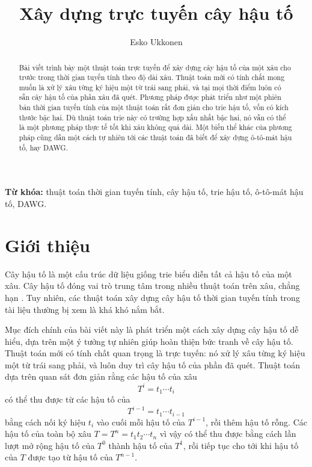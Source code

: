 \documentclass[11pt]{article}
\title{Xây dựng trực tuyến cây hậu tố}
\author{Esko Ukkonen}
\date{}
\begin{document}
\maketitle


\begin{abstract}
Bài viết trình bày một thuật toán trực tuyến để xây dựng cây hậu tố của một
xâu cho trước trong thời gian tuyến tính theo độ dài xâu. Thuật toán mới có
tính chất mong muốn là xử lý xâu từng ký hiệu một từ trái sang phải, và tại
mọi thời điểm luôn có sẵn cây hậu tố của phần xâu đã quét. Phương pháp được
phát triển như một phiên bản thời gian tuyến tính của một thuật toán rất đơn
giản cho trie hậu tố, vốn có kích thước bậc hai. Dù thuật toán trie này có
trường hợp xấu nhất bậc hai, nó vẫn có thể là một phương pháp thực tế tốt khi
xâu không quá dài. Một biến thể khác của phương pháp cũng dẫn một cách tự
nhiên tới các thuật toán đã biết để xây dựng ô-tô-mát hậu tố, hay DAWG.
\end{abstract}

\noindent\textbf{Từ khóa:} thuật toán thời gian tuyến tính, cây hậu tố, trie
hậu tố, ô-tô-mát hậu tố, DAWG.

\section{Giới thiệu}

Cây hậu tố là một cấu trúc dữ liệu giống trie biểu diễn tất cả hậu tố của một
xâu. Cây hậu tố đóng vai trò trung tâm trong nhiều thuật toán trên xâu, chẳng
hạn \cite{apostolico,galil-giancarlo,amir-farach}. Tuy nhiên, các thuật toán
xây dựng cây hậu tố thời gian tuyến tính trong tài liệu thường bị xem là khá
khó nắm bắt.

Mục đích chính của bài viết này là phát triển một cách xây dựng cây hậu tố dễ
hiểu, dựa trên một ý tưởng tự nhiên giúp hoàn thiện bức tranh về cây hậu tố.
Thuật toán mới có tính chất quan trọng là trực tuyến: nó xử lý xâu từng ký
hiệu một từ trái sang phải, và luôn duy trì cây hậu tố của phần đã quét. Thuật
toán dựa trên quan sát đơn giản rằng các hậu tố của xâu
\[
  T^i=t_1\cdots t_i
\]
có thể thu được từ các hậu tố của
\[
  T^{i-1}=t_1\cdots t_{i-1}
\]
bằng cách nối ký hiệu $t_i$ vào cuối mỗi hậu tố của $T^{i-1}$, rồi thêm hậu tố
rỗng. Các hậu tố của toàn bộ xâu $T=T^n=t_1t_2\cdots t_n$ vì vậy có thể thu
được bằng cách lần lượt mở rộng hậu tố của $T^0$ thành hậu tố của $T^1$, rồi
tiếp tục cho tới khi hậu tố của $T$ được tạo từ hậu tố của $T^{n-1}$.
\end{document}
